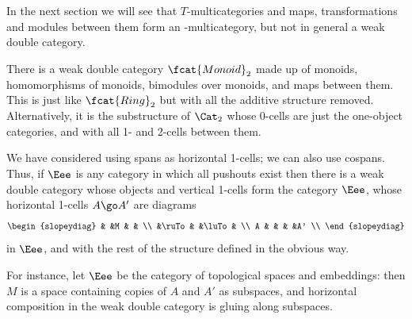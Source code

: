 In the next section we will see that $T$-multicategories and maps,
transformations and modules between them form an \fc-multicategory, but not
in general a weak double category.

\begin{example}	%
%
%
There is a weak double category $\fcat{Monoid}_2$ made up of monoids,
homomorphisms of monoids, bimodules over monoids, and maps between them.
This is just like $\fcat{Ring}_2$ but with all the additive structure
removed.  Alternatively, it is the substructure of $\Cat_2$ whose 0-cells
are just the one-object categories, and with all 1- and 2-cells between
them.
\end{example}

\begin{example}	
We have considered using spans as horizontal 1-cells; we can also use
cospans.%
%
%
 Thus, if $\Eee$ is any category in which all pushouts exist then
there is a weak double category whose objects and vertical 1-cells form the
category $\Eee$, whose horizontal 1-cells $A \go A'$ are diagrams
\[
\begin{slopeydiag}
	&	&M	&	&	\\
	&\ruTo	&	&\luTo	&	\\
A	&	&	&	&A'	\\
\end{slopeydiag}
\]
in $\Eee$, and with the rest of the structure defined in the obvious way.  

For instance, let $\Eee$ be the category of topological%
%
%
spaces and
embeddings: then $M$ is a space containing copies of $A$ and $A'$ as
subspaces, and horizontal composition in the weak double category is gluing
along subspaces. 
\end{example}

